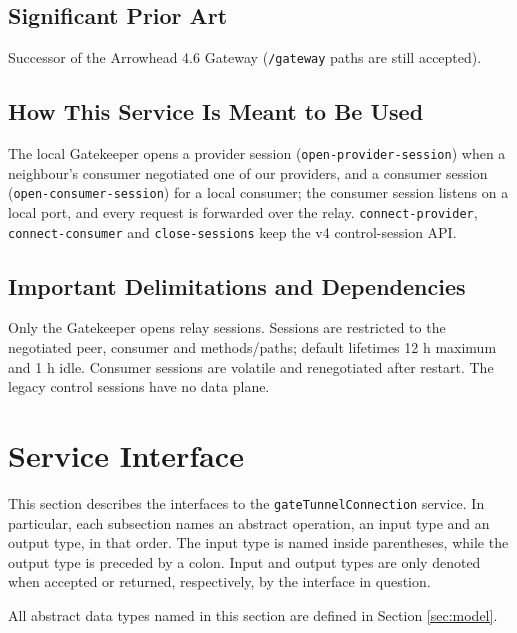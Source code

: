 \documentclass[a4paper]{arrowhead}
\begin{document}
\subsection{Significant Prior Art}

Successor of the Arrowhead 4.6 Gateway (\texttt{/\allowbreak{}gateway} paths are still accepted).

\subsection{How This Service Is Meant to Be Used}

The local Gatekeeper opens a provider session (\texttt{open-\allowbreak{}provider-\allowbreak{}session}) when a neighbour's consumer negotiated one of our providers, and a consumer session (\texttt{open-\allowbreak{}consumer-\allowbreak{}session}) for a local consumer; the consumer session listens on a local port, and every request is forwarded over the relay. \texttt{connect-\allowbreak{}provider}, \texttt{connect-\allowbreak{}consumer} and \texttt{close-\allowbreak{}sessions} keep the v4 control-session API.

\subsection{Important Delimitations and Dependencies}
\label{sec:delimitations}

Only the Gatekeeper opens relay sessions. Sessions are restricted to the negotiated peer, consumer and methods/paths; default lifetimes 12 h maximum and 1 h idle. Consumer sessions are volatile and renegotiated after restart. The legacy control sessions have no data plane.

\newpage

\section{Service Interface}
\label{sec:operations}

This section describes the interfaces to the \texttt{gate\allowbreak{}Tunnel\allowbreak{}Connection} service.
In particular, each subsection names an abstract operation, an input type and an output type, in that order.
The input type is named inside parentheses, while the output type is preceded by a colon.
Input and output types are only denoted when accepted or returned, respectively, by the interface in question.

All abstract data types named in this section are defined in Section \ref{sec:model}.
\end{document}
